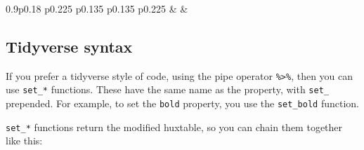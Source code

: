 \documentclass[]{article}
\begin{document}
\begin{table}[h]
\begin{raggedright}
\begin{tabularx}{0.9\textwidth}{p{} p{} p{} p{} p{}}
 & 
 & 
\tabularnewline[-0.5pt]


\end{tabularx}
\par\end{raggedright}
\end{table}

\FloatBarrier

\subsection{Tidyverse syntax}\label{tidyverse-syntax}

If you prefer a tidyverse style of code, using the pipe operator
\texttt{\%\textgreater{}\%}, then you can use \texttt{set\_*} functions.
These have the same name as the property, with \texttt{set\_} prepended.
For example, to set the \texttt{bold} property, you use the
\texttt{set\_bold} function.

\texttt{set\_*} functions return the modified huxtable, so you can chain
them together like this:
\end{document}
